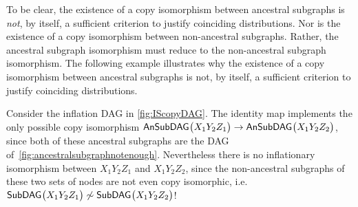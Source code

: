 To be clear, the existence of a copy isomorphism between ancestral subgraphs is \emph{not}, by itself, a sufficient criterion to justify coinciding distributions. Nor is the existence of a copy isomorphism between non-ancestral subgraphs. Rather, the ancestral subgraph isomorphism must reduce to the non-ancestral subgraph isomorphism. The following example illustrates why the existence of a copy isomorphism between ancestral subgraphs is not, by itself, a sufficient criterion to justify coinciding distributions.

Consider the inflation DAG in \cref{fig:IScopyDAG}. The identity map implements the only possible copy isomorphism ${\operatorname{\mathsf{AnSubDAG}}_{}}\bigl\lparen X_1 Y_2 Z_1\bigr\rparen\to{\operatorname{\mathsf{AnSubDAG}}_{}}\bigl\lparen X_1 Y_2 Z_2\bigr\rparen$, since both of these ancestral subgraphs are the DAG of~\cref{fig:ancestralsubgraphnotenough}. Nevertheless there is no inflationary isomorphism between ${X_1 Y_2 Z_1}$ and ${X_1 Y_2 Z_2}$, since the non-ancestral subgraphs of these two sets of nodes are not even copy isomorphic, i.e.~${\operatorname{\mathsf{SubDAG}}_{}}\bigl\lparen X_1 Y_2 Z_1\bigr\rparen\not\sim{\operatorname{\mathsf{SubDAG}}_{}}\bigl\lparen X_1 Y_2 Z_2\bigr\rparen$!



